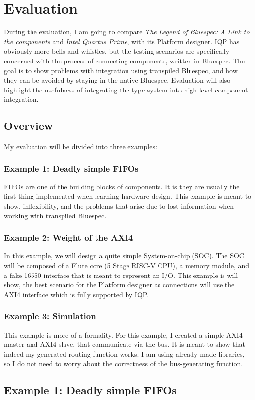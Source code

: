 \documentclass[12pt]{report}
\begin{document}
\chapter{Evaluation} 
During the evaluation, I am going to compare \emph{The Legend of Bluespec: A Link to the components} and \emph{Intel Quartus Prime}, with its Platform designer. 
IQP has obviously more bells and whistles, but the testing scenarios are specifically concerned with the process of connecting components, written in Bluespec. 
The goal is to show problems with integration using transpiled Bluespec, and how they can be avoided by staying in the native Bluespec. 
Evaluation will also highlight the usefulness of integrating the type system into high-level component integration. 

\section{Overview} 
My evaluation will be divided into three examples: 
\subsection{Example 1: Deadly simple FIFOs} FIFOs are one of the building blocks of components. 
It is they are usually the first thing implemented when learning hardware design.
This example is meant to show, inflexibility, and the problems that arise due to lost information when working with transpiled Bluespec. 
\subsection{Example 2: Weight of the AXI4} 
In this example, we will design a quite simple System-on-chip (SOC). 
The SOC will be composed of a Flute core (5 Stage RISC-V CPU), a memory module, and a fake 16550 interface that is meant to represent an I/O. 
This example is will show, the best scenario for the Platform designer as connections will use the AXI4 interface which is fully supported by IQP.
\subsection{Example 3: Simulation} 
This example is more of a formality. 
For this example, I created a simple AXI4 master and AXI4 slave, that communicate via the bus. 
It is meant to show that indeed my generated routing function works. 
I am using already made libraries, so I do not need to worry about the correctness of the bus-generating function. 
\section{Example 1: Deadly simple FIFOs} 
\end{document}
